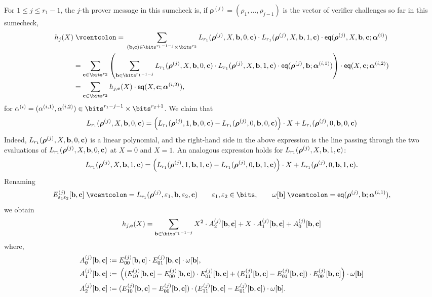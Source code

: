 \documentclass[11pt,letterpaper,usenames,dvipsnames]{article}
\begin{document}
For $1\leq j\leq r_1-1$, the $j$-th prover message in this sumcheck is, if $\bm{\rho}^{(j)}=(\rho_1, \ldots, \rho_{j-1})$ is the vector of verifier challenges so far in this sumecheck,
%
\begin{align*}
h_j(X)&\defeq \sum_{(\bb,\cc)\in \bits^{r_1-1-j}\times \bits^{r_2}} L_{r_1}(\bm{\rho}^{(j)}, X, \bb,0,\cc) \cdot L_{r_1}(\bm{\rho}^{(j)}, X, \bb,1,\cc)\cdot \eq(\bm{\rho}^{(j)}, X, \bb,\cc;\bm{\alpha}^{(i)})\\
&= \sum_{\cc\in \bits^{r_2}}\left( \sum_{\bb\in \bits^{r_1-1-j}}L_{r_1}(\bm{\rho}^{(j)}, X, \bb,0,\cc) \cdot L_{r_1}(\bm{\rho}^{(j)}, X, \bb,1,\cc) \cdot \eq(\bm{\rho}^{(j)}, \bb;\bm{\alpha}^{(i,1)})\right)\cdot   \eq(X,\cc;\bm{\alpha}^{(i,2)}) \\
&= \sum_{\cc\in \bits^{r_2}}h_{j,\cc}(X)\cdot   \eq(X,\cc;\bm{\alpha}^{(i,2)}),
\end{align*}
for $\alpha^{(i)} = (\alpha^{(i,1)}, \alpha^{(i,2)})\in \bits^{r_1-j-1}\times \bits^{r_2+1}$.
%
We claim that
%
\begin{equation}\label{e:grand_product_Lr1}
L_{r_1}(\bm{\rho}^{(j)}, X, \mathbf{b},0,\mathbf{c}) = \left(L_{r_1}(\bm{\rho}^{(j)}, 1, \mathbf{b},0,\mathbf{c}) -  L_{r_1}(\bm{\rho}^{(j)}, 0, \mathbf{b},0,\mathbf{c})\right)\cdot X + L_{r_1}(\bm{\rho}^{(j)}, 0, \mathbf{b},0,\mathbf{c})
\end{equation}
Indeed, $L_{r_1}(\bm{\rho}^{(j)}, X, \mathbf{b},0,\mathbf{c})$ is a linear polynomial, and the right-hand side in the above expression is the line passing through the two evaluations of  $L_{r_1}(\bm{\rho}^{(j)}, X, \mathbf{b},0,\mathbf{c})$ at $X=0$ and $X=1$. An analogous expression holds for $L_{r_1}(\bm{\rho}^{(j)}, X, \mathbf{b}, 1, \mathbf{c})$:
\begin{equation}\label{e:grand_product_Lr2}
L_{r_1}(\bm{\rho}^{(j)}, X, \mathbf{b},1,\mathbf{c}) = \left(L_{r_1}(\bm{\rho}^{(j)}, 1, \mathbf{b},1,\mathbf{c}) -  L_{r_1}(\bm{\rho}^{(j)}, 0, \mathbf{b},1,\mathbf{c})\right)\cdot X + L_{r_1}(\bm{\rho}^{(j)}, 0, \mathbf{b},1,\mathbf{c}).
\end{equation}
%
Renaming
%
$$
E_{\eps_1\eps_2}^{(j)}[\bb,\cc] \defeq L_{r_1}(\bm{\rho}^{(j)}, \eps_1, \bb, \eps_2,\cc) \qquad \eps_1,\eps_2\in \bits, \qquad \omega[\bb]\defeq \eq(\bm{\rho}^{(j)}, \bb;\bm{\alpha}^{(i,1)}),
$$
we obtain
%
$$
h_{j,\cc}(X) =\sum_{\bb\in \bits^{r_1-1-j}} X^2 \cdot A_2^{(j)}[\bb,\cc] + X\cdot A_1^{(j)}[\bb,\cc] + A_0^{(j)}[\bb,\cc]
$$
 where,   
$$
\begin{aligned}
A_0^{(j)}[\mathbf{b},\mathbf{c}] &{\;\vcentcolon=\;} E_{00}^{(j)}[\mathbf{b},\mathbf{c}]\cdot E_{01}^{(j)} [\mathbf{b},\mathbf{c}]\cdot \omega[\mathbf{b}],\\ 
A_1^{(j)}[\mathbf{b},\mathbf{c}] &{\;\vcentcolon=\;}  \left((E_{10}^{(j)}[\mathbf{b},\mathbf{c}]-E_{00}^{(j)}[\mathbf{b},\mathbf{c}])\cdot E_{01}^{(j)}[\mathbf{b},\mathbf{c}] + (E_{11}^{(j)}[\mathbf{b},\mathbf{c}]-E_{01}^{(j)}[\mathbf{b},\mathbf{c}])\cdot E_{00}^{(j)}[\mathbf{b},\mathbf{c}]\right)\cdot \omega[\mathbf{b}]\\
A_2^{(j)}[\mathbf{b},\mathbf{c}] &{\;\vcentcolon=\;} (E_{10}^{(j)}[\mathbf{b},\mathbf{c}]-E_{00}^{(j)}[\mathbf{b},\mathbf{c}])\cdot (E_{11}^{(j)}[\mathbf{b},\mathbf{c}]-E_{01}^{(j)}[\mathbf{b},\mathbf{c}])\cdot \omega[\mathbf{b}].
\end{aligned}
$$
\end{document}
